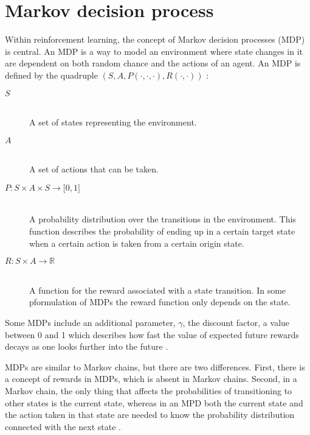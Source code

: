 \section{Markov decision process}
\label{sec:mdps}

Within reinforcement learning, the concept of Markov decision processes (MDP) is central. An MDP is a way to model an environment where state changes in it are dependent on both random chance and the actions of an agent. An MDP is defined by the quadruple $\left( S, A, P( \cdot , \cdot, \cdot ) , R( \cdot , \cdot ) \right)$ \parencite{altman2002applications}:

\begin{description}
\item[$S$] \hfill \\ 
    A set of states representing the environment.

\item[$A$] \hfill \\ 
    A set of actions that can be taken.

\item[$P \colon S \times A \times S \to \mathbb \lbrack0, 1\rbrack$] \hfill \\ 
    A probability distribution over the transitions in the environment. This
    function describes the probability of ending up in a certain target state
    when a certain action is taken from a certain origin state. 

\item[$R \colon S \times A \to \mathbb{R}$] \hfill \\ 
    A function for the reward associated with a state transition. In some
    pformulation of MDPs the reward function only depends on the state.

\end{description}

Some MDPs include an additional parameter, $\gamma$, the discount factor, a
value between 0 and 1 which describes how fast the value of expected future
rewards decays as one looks further into the future
\parencite{barto1998reinforcement}.

MDPs are similar to Markov chains, but there are two differences. First, there
is a concept of rewards in MDPs, which is absent in Markov chains. Second, in a
Markov chain, the only thing that affects the probabilities of transitioning to
other states is the current state, whereas in an MPD both the current state and
the action taken in that state are needed to know the probability distribution
connected with the next state \parencite{altman2002applications}.





